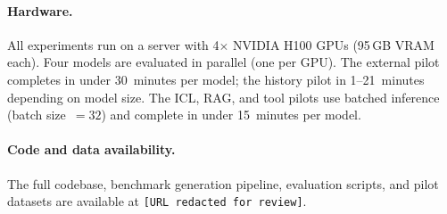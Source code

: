 \paragraph{Hardware.}
All experiments run on a server with 4$\times$ NVIDIA H100
GPUs (95\,GB VRAM each).
Four models are evaluated in parallel (one per GPU).
The external pilot completes in under 30~minutes per model;
the history pilot in 1--21~minutes depending on model size.
The ICL, RAG, and tool pilots use batched inference
(batch size~$= 32$) and complete in under 15~minutes per
model.

\paragraph{Code and data availability.}
The full codebase, benchmark generation pipeline, evaluation
scripts, and pilot datasets are available at
\texttt{[URL redacted for review]}.
